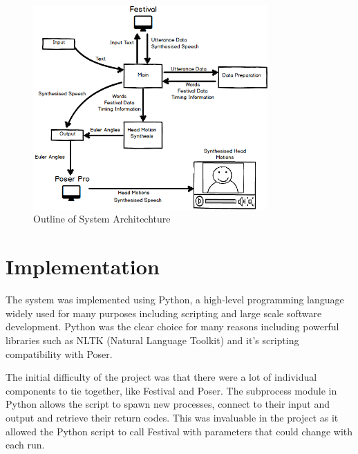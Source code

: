 \documentclass[bsc,frontabs,twoside,singlespacing,parskip]{infthesis}
\begin{document}
\begin{figure}
	\centering
	\includegraphics[width=0.8\textwidth]{system.png}
	\caption{Outline of System Architechture}
\end{figure}




\chapter{Implementation}

The system was implemented using Python, a high-level programming language widely used for many purposes including scripting and large scale software development. Python was the clear choice for many reasons including powerful libraries such as NLTK (Natural Language Toolkit) \cite{nltk} and it's scripting compatibility with Poser. 

The initial difficulty of the project was that there were a lot of individual components to tie together, like Festival and Poser. The subprocess module in Python allows the script to spawn new processes, connect to their input and output and retrieve their return codes. This was invaluable in the project as it allowed the Python script to call Festival with parameters that could change with each run.
\end{document}
